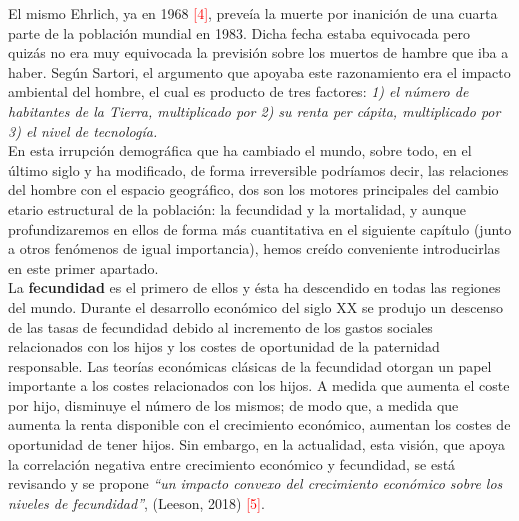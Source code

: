 El mismo Ehrlich, ya en 1968 \textcolor{red}{[4]}, preve\'ia la muerte por inanici\'on de una cuarta parte de la poblaci\'on mundial en 1983. Dicha fecha estaba equivocada pero quiz\'as no era muy equivocada la previsi\'on sobre los muertos de hambre que iba a haber. Seg\'un Sartori, el argumento que apoyaba este razonamiento era el impacto ambiental del hombre, el cual es producto de tres factores: \textit{1) el n\'umero de habitantes de la Tierra, multiplicado por 2) su renta per c\'apita, multiplicado por 3) el nivel de tecnolog\'ia.}\\

\vspace{-0.2cm}
En esta irrupci\'on demogr\'afica que ha cambiado el mundo, sobre todo, en el \'ultimo siglo y ha modificado, de forma irreversible podr\'iamos decir, las relaciones del hombre con el espacio geogr\'afico, dos son los motores principales del cambio etario estructural de la poblaci\'on: la fecundidad y la mortalidad, y aunque profundizaremos en ellos de forma m\'as cuantitativa en el siguiente cap\'itulo (junto a otros fen\'omenos de igual importancia), hemos cre\'ido conveniente introducirlas en este primer apartado.\\ 

\vspace{-0.2cm}
La \textbf{fecundidad} es el primero de ellos y \'esta ha descendido en todas las regiones del mundo. Durante el desarrollo econ\'omico del siglo XX se produjo un descenso de las tasas de fecundidad debido al incremento de los gastos sociales relacionados con los hijos y los costes de oportunidad de la paternidad responsable. Las teor\'ias econ\'omicas cl\'asicas de la fecundidad otorgan un papel importante a los costes relacionados con los hijos. A medida que aumenta el coste por hijo, disminuye el n\'umero de los mismos; de modo que, a medida que aumenta la renta disponible con el crecimiento econ\'omico, aumentan los costes de oportunidad de tener hijos. Sin embargo, en la actualidad, esta visi\'on, que apoya la correlaci\'on negativa entre crecimiento econ\'omico y fecundidad, se est\'a revisando y se propone \textit{``un impacto convexo del crecimiento econ\'omico sobre los niveles de fecundidad''}, (Leeson, 2018) \textcolor{red}{[5]}.\\

